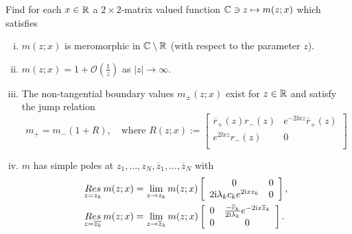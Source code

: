\begin{samepage}
\begin{framed}
\begin{rhp}\label{rhp m}
Find for each $x\in\mathbb R$ a $2\times 2$-matrix valued function $\mathbb C\ni z\mapsto m(z;x)$ which satisfies
\begin{enumerate}[(i)]
  \item $m(z;x)$ is meromorphic in $\mathbb C\setminus\mathbb R$ (with respect to the parameter $z$).
  \item $m(z;x)=1+\mathcal{O}\left(\frac{1}{z}\right)$ as $|z|\to\infty$.
  \item The non-tangential boundary values $m_{\pm}(z;x)$ exist for $z\in\mathbb R$ and satisfy the jump relation
      \begin{equation}\label{e jump}
        m_+=m_-(1+R),\quad\text{where }
        R(z;x):=
        \left[
          \begin{array}{cc}
            \overline{r}_+(z)r_-(z) & e^{-2\ii xz}\overline{r}_+(z) \\
            e^{2\ii xz}r_-(z) & 0 \\
          \end{array}
        \right]
      \end{equation}
  \item $m$ has simple poles at $z_1,...,z_N,\overline{z}_1,...,\overline{z}_N$ with
      \begin{equation*}%
        \begin{aligned}
          \res_{z=z_k}m(z;x)&=\lim_{z\to z_k}m(z;x)
          \left[
            \begin{array}{cc}
              0 & 0 \\
              2\ii\lambda_kc_k e^{2\ii xz_k} & 0
            \end{array}
          \right],\\
          \res_{z=\overline{z_k}}m(z;x)&=\lim_{z\to \overline{z}_k}m(z;x)
          \left[
            \begin{array}{cc}
              0 & \frac{-\overline{c}_k}{2\ii\lambda_k} e^{-2\ii x\overline{z}_k} \\
              0 & 0
            \end{array}
          \right].
        \end{aligned}
      \end{equation*}
\end{enumerate}
\end{rhp}
\end{framed}
\end{samepage}
